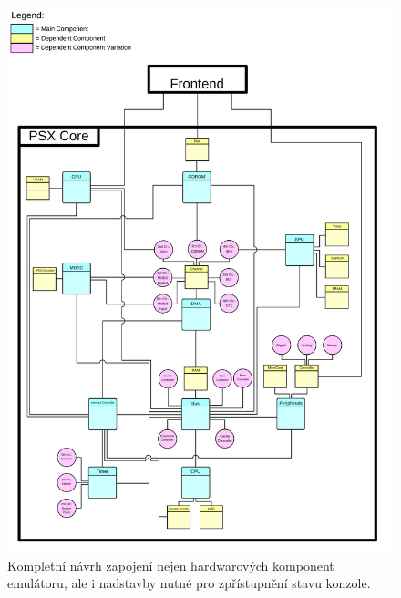 \begin{figure}[hbt]
\centering
\includegraphics[width=1.0\textwidth]{obrazky-figures/psx-arch-simple.png}
\caption[Návrh architektury jádra emulátoru]{Kompletní návrh zapojení nejen hardwarových komponent emulátoru, ale i nadstavby nutné pro zpřístupnění stavu konzole.}
\label{psx-layout}
\end{figure}

